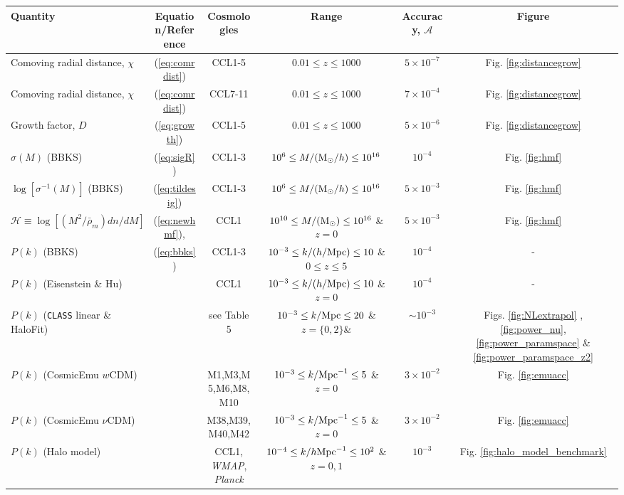 
%
\begin{sidewaystable*}[!htp]
  \centering
  \begin{tabular}{ l|c c c c c}
    \hline
    Quantity & Equation/Reference & Cosmologies & Range & Accuracy, $\mathcal{A}$ & Figure \\
    \hline
    Comoving radial distance, $\chi$ & (\ref{eq:comrdist}) & CCL1-5 & $0.01 \leq z\leq 1000$ &  $5\times 10^{-7}$ & Fig. \ref{fig:distancegrow}\\
    Comoving radial distance, $\chi$ & (\ref{eq:comrdist}) & CCL7-11 & $0.01 \leq z\leq 1000$ &  $7\times 10^{-4}$ & Fig. \ref{fig:distancegrow}\\
    Growth factor, $D$ & (\ref{eq:growth}) & CCL1-5 &  $0.01 \leq z\leq 1000 $ &  $5\times 10^{-6}$ & Fig. \ref{fig:distancegrow}\\
    $\sigma(M)$ (BBKS) & (\ref{eq:sigR}) & CCL1-3 &  $10^6\leq M/({\rm M}_\odot/h)\leq 10^{16}$ &  $10^{-4}$ & Fig. \ref{fig:hmf}\\
    $\log[\sigma^{-1}(M)]$ (BBKS) & (\ref{eq:tildesig}) & CCL1-3 &  $10^6\leq M/({\rm M}_\odot/h)\leq 10^{16}$ &  $5\times 10^{-3}$ & Fig. \ref{fig:hmf}\\
    $\mathcal H \equiv \log[(M^2/\bar{\rho}_m)dn/dM]$  & (\ref{eq:newhmf}), \citet{Tinker2010} & CCL1 & $10^{10}\leq M/({\rm M}_\odot)\leq 10^{16}$ \& $z=0$ & $5\times 10^{-3}$ & Fig. \ref{fig:hmf}\\
    $P(k)$ (BBKS) & (\ref{eq:bbks}) & CCL1-3 & $10^{-3}\leq k/(h/{\rm Mpc})\leq 10$ \& $0\leq z\leq 5$ &  $10^{-4}$ & -\\
    $P(k)$ (Eisenstein \& Hu) & \citet{1998ApJ...496..605E}  & CCL1 & $10^{-3}\leq k/(h/{\rm Mpc})\leq 10$ \& $z=0$ & $10^{-4}$ & -\\
    $P(k)$ ({\tt CLASS} linear \& HaloFit) & \citet{CLASS_halofit}  & see Table 5 & $10^{-3}\leq k/{\rm Mpc}\leq 20$ \& $z=\{0,2\}$\&  & $\sim 10^{-3}$ & Figs. \ref{fig:NLextrapol} , \ref{fig:power_nu}, \ref{fig:power_paramspace} \& \ref{fig:power_paramspace_z2} \\
    $P(k)$ (CosmicEmu $w$CDM) & \citet{Lawrence17} & M1,M3,M5,M6,M8,M10 & $10^{-3}\leq k/{\rm Mpc}^{-1}\leq 5$ \& $z=0$  & $3\times 10^{-2}$ & Fig. \ref{fig:emuacc}\\
    $P(k)$ (CosmicEmu $\nu$CDM) & \citet{Lawrence17} & M38,M39,M40,M42 & $10^{-3}\leq k/{\rm Mpc}^{-1}\leq 5$ \& $z=0$ & $3\times 10^{-2}$ & Fig. \ref{fig:emuacc}\\
    $P(k)$ (Halo model) & \citet{Cooray2002} & CCL1, {\it WMAP}, {\it Planck} & $10^{-4}\leq k/h{\rm Mpc}^{-1}\leq 10^{2}$ \& $z=0,1$ & $10^{-3}$ & Fig. \ref{fig:halo_model_benchmark}\\

\end{tabular}
\end{sidewaystable*}
